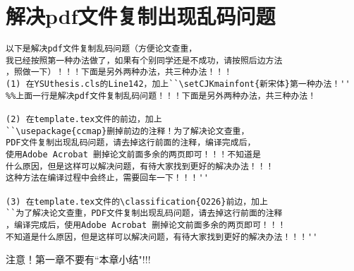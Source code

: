 \section{解决pdf文件复制出现乱码问题}\label{section1-4}
\begin{verbatim}
以下是解决pdf文件复制乱码问题（方便论文查重，
我已经按照第一种办法做了，如果有个别同学还是不成功，请按照后边方法
，照做一下）！！！下面是另外两种办法，共三种办法！！！
(1) 在YSUthesis.cls的Line142，加上``\setCJKmainfont{新宋体}第一种办法！''
%%上面一行是解决pdf文件复制乱码问题！！！下面是另外两种办法，共三种办法！

(2) 在template.tex文件的前边，加上
``\usepackage{ccmap}删掉前边的注释！为了解决论文查重，
PDF文件复制出现乱码问题，请去掉这行前面的注释，编译完成后，
使用Adobe Acrobat 删掉论文前面多余的两页即可！！！不知道是
什么原因，但是这样可以解决问题，有待大家找到更好的解决办法！！！
这种方法在编译过程中会终止，需要回车一下！！！''

(3) 在template.tex文件的\classification{O226}前边，加上
``为了解决论文查重，PDF文件复制出现乱码问题，请去掉这行前面的注释
，编译完成后，使用Adobe Acrobat 删掉论文前面多余的两页即可！！！
不知道是什么原因，但是这样可以解决问题，有待大家找到更好的解决办法！！！''

\end{verbatim}

注意！第一章不要有``本章小结"!!!


%
